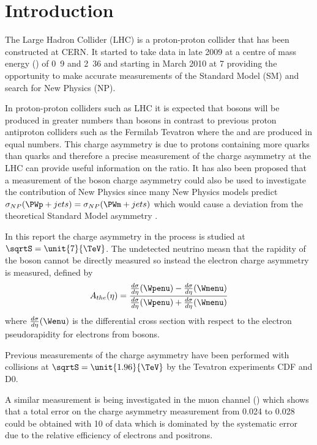 
\chapter{Introduction}
The Large Hadron Collider (LHC) is a proton-proton collider that has been
constructed at CERN. 
It started to take data in late 2009 at a centre of mass energy (\sqrtS) of
\unit{0.9}{\TeV} and \unit{2.36}{\TeV} 
and starting in March 2010 at \unit{7}{\TeV} providing the opportunity to make
accurate measurements of the Standard Model 
(SM) and search for New Physics (NP).

In proton-proton colliders such as LHC it is expected that \PWp bosons will be
produced in greater numbers than \PWm bosons 
in contrast to previous proton antiproton colliders such as the Fermilab
Tevatron where the \PWp and \PWm are produced in equal numbers.
This charge asymmetry is due to protons containing more \Pup quarks than \Pdown
quarks and therefore a precise measurement of the 
\PW charge asymmetry at the LHC can provide useful information on the
\nicefrac{\Pup}{\Pdown} ratio\cite{phenom,pdf}.
It has also been proposed that a measurement of the \PWpm boson charge
asymmetry could also be used to investigate 
the contribution of New Physics since many New Physics models predict
$\sigma_{NP}(\PWp + jets) = \sigma_{NP}(\PWm + jets)$ 
which would cause a deviation from the theoretical Standard Model asymmetry
\cite{kom}.

In this report the charge asymmetry in the process
 is studied at 
$\sqrtS = \unit{7}{\TeV}$. The undetected neutrino measn that the rapidity of the
\PW boson cannot be directly measured 
so instead the electron charge asymmetry is measured, defined by
\begin{equation}
A_{the}(\eta)=\frac{  \frac{d\sigma}{d\eta}(\Wpenu) -
\frac{d\sigma}{d\eta}(\Wmenu) }{ \frac{d\sigma}{d\eta}(\Wpenu) +
\frac{d\sigma}{d\eta}(\Wmenu) }
\end{equation} 
where $\frac{d\sigma}{d\eta}(\Wenu)$ is the differential cross section with
respect to the electron pseudorapidity 
for electrons from \PWpm bosons\cite{kom}.

Previous measurements of the charge asymmetry have been performed with
\HepProcess{\Pproton\APproton} collisions at 
$\sqrtS = \unit{1.96}{\TeV}$ by the Tevatron experiments CDF\cite{cdfWAsym} and
D0\cite{d0WAsym}. 

A similar measurement is being investigated in the muon channel
() 
which shows that a total error on the charge asymmetry measurement from 0.024
to 0.028 could be obtained with \unit{10}{\invpb} 
of data which is dominated by the systematic error due to the relative
efficiency of electrons and positrons.\cite{wmunu}

